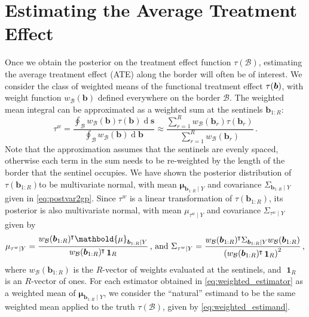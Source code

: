 \documentclass[letter,12pt]{article}
\DeclarePairedDelimiter{\parenthesis}{\lparen}{\rparen}
\newcommand{\del}[1]{\parenthesis*{#1}}
\DeclareMathOperator{\dif}{d}
\DeclareMathOperator{\ones}{\mathbf{1}}
\newcommand*{\trans}{^{\mkern-1.5mu\intercal}}
\newcommand{\svec}{\mathbold{s}}
\newcommand{\muvec}{\mathbold{\mu}}
\newcommand{\border}{\mathcal{B}}
\newcommand{\sentinel}{\bm{b}}
\newcommand{\numsent}{R}
\newcommand{\sentinels}{\sentinel_{1:\numsent}}
\newcommand{\isent}{r}
\newcommand{\tauw}{\tau^{w}}
\newcommand{\weightb}{w_{\border}}
\begin{document}
\hypertarget{characterizing-and-estimating-the-average-treatment-effect}{%
\section{Estimating the Average Treatment Effect}\label{characterizing-and-estimating-the-average-treatment-effect}}
\label{sec:ate}

Once we obtain the posterior on the treatment effect function \(\tau(\border)\), estimating the average treatment effect (ATE) along the border will often be of interest.
We consider the class of weighted means of the functional treatment effect \(\tau\del{\sentinel}\),
with weight function \(\weightb(\sentinel)\) defined everywhere on the border \(\border\).
The weighted mean integral can be approximated as a weighted sum at the sentinels \(\sentinels\):
\begin{equation}
    \tauw = \frac{\oint_\border \left. \weightb(\sentinel) \tau(\sentinel) \dif \svec \right.}
    {\oint_\border \left. \weightb(\sentinel) \dif \sentinel \right.}
    \approx \frac{\sum_{\isent=1}^\numsent \weightb(\sentinel_\isent) \tau(\sentinel_\isent)}
    {\sum_{\isent=1}^\numsent \weightb(\sentinel_\isent) } \,.
\label{eq:weighted_estimand}
\end{equation}
Note that the approximation assumes that the sentinels are evenly spaced, otherwise each term in the sum needs to be re-weighted by the length of the border that the sentinel occupies.
We have shown the posterior distribution of \(\tau(\sentinels)\)to be multivariate normal, with mean \(\muvec_{\sentinels \mid Y}\) and covariance \(\Sigma_{\sentinels \mid Y}\) given in \eqref{eq:postvar2gp}.
Since \(\tauw\) is a linear transformation of \(\tau(\sentinels)\), its posterior is also multivariate normal, with mean \(\mu_{\tauw \mid Y}\) and covariance \(\Sigma_{\tauw \mid Y}\) given by
\begin{equation}
    \mu_{\tauw \mid Y} = \frac{\weightb(\sentinels)\trans \muvec_{\sentinels \mid Y}}
    {\weightb(\sentinels)\trans  \ones_\numsent}\,\text{, and }
    \Sigma_{\tauw \mid Y} = \frac{\weightb(\sentinels)\trans \Sigma_{\sentinels \mid Y} \weightb(\sentinels)}
    { \del{\weightb(\sentinels)\trans  \ones_\numsent }^2 } \,,
\label{eq:weighted_estimator}
\end{equation}
where \(\weightb(\sentinels)\) is the \(\numsent\)-vector of weights evaluated at the sentinels, and \(\ones_\numsent\) is an \(\numsent\)-vector of ones.
For each estimator obtained in \eqref{eq:weighted_estimator} as a weighted mean of \(\muvec_{\sentinels \mid Y}\), we consider the ``natural'' estimand to be the same weighted mean applied to the truth \(\tau(\border)\), given by \eqref{eq:weighted_estimand}.
\end{document}
